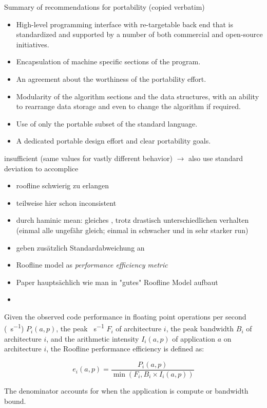 Summary of recommendations for portability (copied verbatim)
\begin{itemize}
    \item High-level programming interface with re-targetable back end that is standardized and supported by a number of both commercial and open-source initiatives.
    \item Encapsulation of machine specific sections of the program.
    \item An agreement about the worthiness of the portability effort.
    \item Modularity of the algorithm sections and the data structures, with an ability to rearrange data storage and even to change the algorithm if required.
    \item Use of only the portable subset of the standard language.
    \item A dedicated portable design effort and clear portability goals.
\end{itemize}

\newpage
\cite{bertoni_performance_2020}

\pp insufficient (same \pp values for vastly different behavior) $\rightarrow$ also use standard deviation to accomplice \pp 

\begin{itemize}
    \item roofline schwierig zu erlangen 
    \item teilweise hier schon inconsistent
    \item durch haminic mean: gleiches \pp, trotz drastisch unterschiedlichen verhalten (einmal alle ungefähr gleich; einmal in schwacher und in sehr starker run)
    \item geben zusätzlich Standardabweichung an
\end{itemize}


\newpage
\cite{yang_empirical_2018}

\begin{itemize}
    \item Roofline model as \textit{performance efficiency metric}
    \item Paper hauptsächlich wie man in "gutes" Roofline Model aufbaut
    \item 
\end{itemize}

\begin{definition}\label{def:roof_eff}
Given the observed code performance in floating point operations per second (\si{\flop\per\second}) $P_i(a, p)$, the peak \si{\flop\per\second} $F_i$ of architecture $i$, the peak bandwidth $B_i$ of architecture $i$, and the arithmetic intensity $I_i(a, p)$ of application $a$ on architecture $i$, the Roofline performance efficiency is defined as:

$$e_i(a, p) = \frac{P_i(a, p)}{\min(F_i, B_i \times I_i(a, p))}$$
\end{definition}
The denominator accounts for when the application is compute or bandwidth bound.


